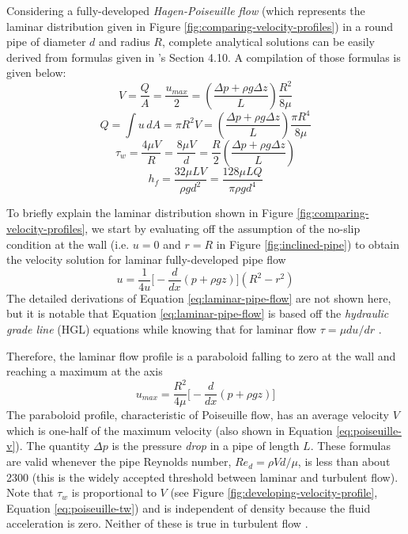 \documentclass[10pt]{article} %
\numberwithin{equation}{section} %
\begin{document}
\begin{multicols}{2}
Considering a fully-developed \textit{Hagen-Poiseuille flow} (which represents the laminar distribution given in Figure \ref{fig:comparing-velocity-profiles}) in a round pipe of diameter $d$ and radius $R$, complete analytical solutions can be easily derived from formulas given in \textcite{fluid-mechanics}'s Section 4.10. A compilation of those formulas is given below:
\begin{equation} \label{eq:poiseuille-v}
V = \frac{Q}{A} = \frac{u_{max}}{2} = \left( \frac{\Delta p + \rho g \Delta z}{L} \right) \frac{R^{2}}{8 \mu}
\end{equation}
\begin{equation} \label{eq:poiseuille-q}
Q = \int u\, dA = \pi R^{2} V = \left( \frac{\Delta p + \rho g \Delta z}{L} \right) \frac{\pi R^{4}}{8 \mu}
\end{equation}
\begin{equation} \label{eq:poiseuille-tw}
\tau_{w} = \frac{4 \mu V}{R} = \frac{8 \mu V}{d} = \frac{R}{2} \left( \frac{\Delta p + \rho g \Delta z}{L} \right)
\end{equation}
\begin{equation}
h_{f} = \frac{32 \mu L V}{\rho g d^{2}} = \frac{128 \mu L Q}{\pi \rho g d^{4}}
\end{equation}


To briefly explain the laminar distribution shown in Figure \ref{fig:comparing-velocity-profiles}, we start by evaluating off the assumption of the no-slip condition at the wall (i.e. $u=0$ and $r=R$ in Figure \ref{fig:inclined-pipe}) to obtain the velocity solution for laminar fully-developed pipe flow
\begin{equation} \label{eq:laminar-pipe-flow}
u = \frac{1}{4 u} \big[ -\frac{d}{dx} (p + \rho g z) \big] (R^{2} - r^{2})
\end{equation}
The detailed derivations of Equation \ref{eq:laminar-pipe-flow} are not shown here, but it is notable that Equation \ref{eq:laminar-pipe-flow} is based off the \textit{hydraulic grade line} (HGL) equations while knowing that for laminar flow $\tau = \mu du/dr$ \cite{fluid-mechanics}.

Therefore, the laminar flow profile is a paraboloid falling to zero at the wall and reaching a maximum at the axis
\begin{equation}
u_{max} = \frac{R^{2}}{4 \mu} \big[  -\frac{d}{dx} (p + \rho g z) \big]
\end{equation}
The paraboloid profile, characteristic of Poiseuille flow, has an average velocity $V$ which is one-half of the maximum velocity (also shown in Equation \ref{eq:poiseuille-v}). The quantity $\Delta p$ is the pressure \textit{drop} in a pipe of length $L$. These formulas are valid whenever the pipe Reynolds number, $Re_{d} = \rho V d/\mu$, is less than about 2300 (this is the widely accepted threshold between laminar and turbulent flow). Note that $\tau_{w}$ is proportional to $V$ (see Figure \ref{fig:developing-velocity-profile}, Equation \ref{eq:poiseuille-tw}) and is independent of density because the fluid acceleration is zero. Neither of these is true in turbulent flow \cite{fluid-mechanics}.


\end{multicols}
\end{document}
